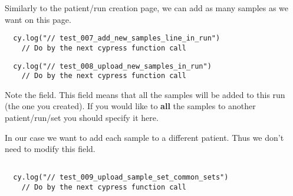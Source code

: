 Similarly to the patient/run creation page, we can add as many samples as we
want on this page.

\begin{verbatim}
  cy.log("// test_007_add_new_samples_line_in_run")
    // Do by the next cypress function call

\end{verbatim}

\begin{verbatim}
  cy.log("// test_008_upload_new_samples_in_run")
    // Do by the next cypress function call

\end{verbatim}

Note the  field. This field means that all the samples will
be added to this run (the one you created). If you would like to \textbf{all}
the samples to another patient/run/set you should specify it here.

In our case we want to add each sample to a different patient. Thus we don't
need to modify this field.

\begin{verbatim}
 
  cy.log("// test_009_upload_sample_set_common_sets")
    // Do by the next cypress function call

\end{verbatim}

